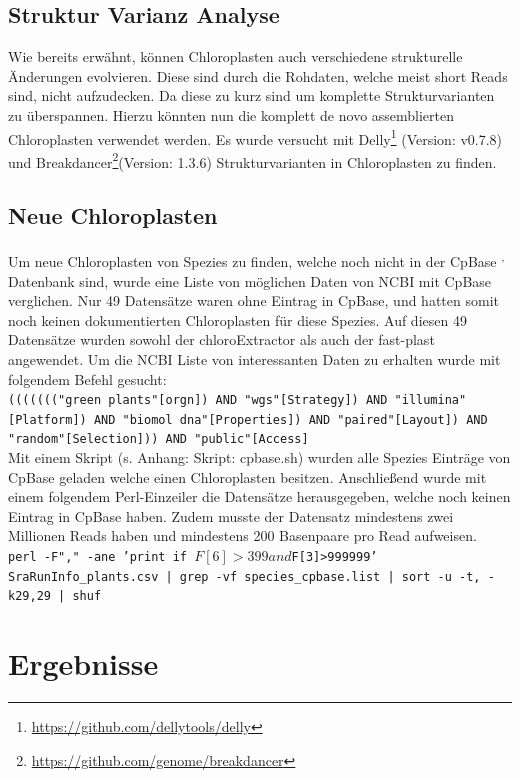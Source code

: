 \documentclass{scrartcl}
\begin{document}
\subsection{Struktur Varianz Analyse}
\label{sec-3-5}
Wie bereits erwähnt, können Chloroplasten auch verschiedene strukturelle Änderungen evolvieren. Diese sind durch die Rohdaten, welche meist short Reads sind, nicht aufzudecken.
Da diese zu kurz sind um komplette Strukturvarianten zu überspannen.\footnotemark[7]{} Hierzu könnten nun die komplett de novo assemblierten Chloroplasten verwendet werden.
Es wurde versucht mit Delly\footnote{\url{https://github.com/dellytools/delly}} (Version: v0.7.8) und Breakdancer\footnote{\url{https://github.com/genome/breakdancer}}(Version: 1.3.6) Strukturvarianten in Chloroplasten zu finden.  

\subsection{Neue Chloroplasten}
\label{sec-3-6}
Um neue Chloroplasten von Spezies zu finden, welche noch nicht in der CpBase \footnotemark[39]{}\textsuperscript{,}\,\footnotemark[40]{} Datenbank sind, wurde eine Liste von möglichen Daten von NCBI mit CpBase verglichen. Nur 49 Datensätze waren ohne 
Eintrag in CpBase, und hatten somit noch keinen dokumentierten Chloroplasten für diese Spezies. Auf diesen 49 Datensätze wurden sowohl der chloroExtractor als auch der fast-plast angewendet. 
Um die NCBI Liste von interessanten Daten zu erhalten wurde mit folgendem Befehl gesucht:
\\
\texttt{((((((("green plants"[orgn]) AND "wgs"[Strategy]) AND "illumina"[Platform]) AND "biomol dna"[Properties]) AND "paired"[Layout]) AND "random"[Selection])) AND "public"[Access]}
\\
Mit einem Skript (s. Anhang: Skript: cpbase.sh) wurden alle Spezies Einträge von CpBase geladen welche einen Chloroplasten besitzen. Anschließend wurde mit einem folgendem Perl-Einzeiler
die Datensätze herausgegeben, welche noch keinen Eintrag in CpBase haben. Zudem musste der Datensatz mindestens zwei Millionen Reads haben und mindestens 200 Basenpaare pro Read
aufweisen.
\\
\texttt{perl -F"," -ane 'print if $F[6]>399 and $F[3]>999999' SraRunInfo\_plants.csv | grep -vf species\_cpbase.list | sort -u -t, -k29,29 | shuf}



\section{Ergebnisse}
\label{sec-4}
\end{document}
